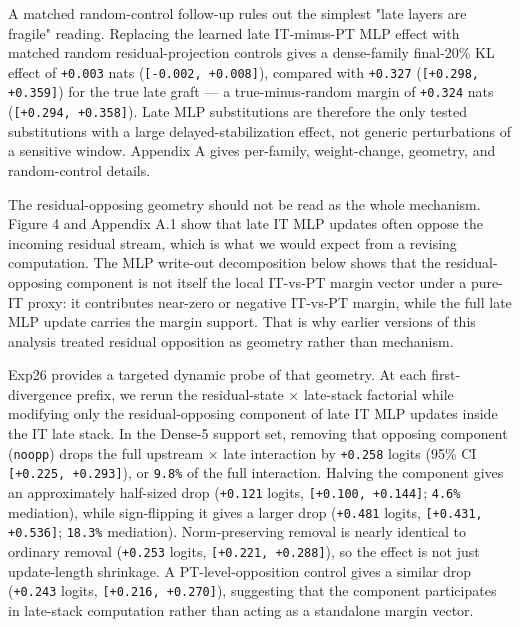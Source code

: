 \documentclass[11pt]{article}
\begin{document}
A matched random-control follow-up rules out the simplest "late layers are fragile" reading. Replacing the learned late IT-minus-PT MLP effect with matched random residual-projection controls gives a dense-family final-20\% KL effect of \texttt{+0.003} nats (\texttt{[-0.002, +0.008]}), compared with \texttt{+0.327} (\texttt{[+0.298, +0.359]}) for the true late graft --- a true-minus-random margin of \texttt{+0.324} nats (\texttt{[+0.294, +0.358]}). Late MLP substitutions are therefore the only tested substitutions with a large delayed-stabilization effect, not generic perturbations of a sensitive window. Appendix A gives per-family, weight-change, geometry, and random-control details.

The residual-opposing geometry should not be read as the whole mechanism. Figure 4 and Appendix A.1 show that late IT MLP updates often oppose the incoming residual stream, which is what we would expect from a revising computation. The MLP write-out decomposition below shows that the residual-opposing component is not itself the local IT-vs-PT margin vector under a pure-IT proxy: it contributes near-zero or negative IT-vs-PT margin, while the full late MLP update carries the margin support. That is why earlier versions of this analysis treated residual opposition as geometry rather than mechanism.

Exp26 provides a targeted dynamic probe of that geometry. At each first-divergence prefix, we rerun the residual-state \ensuremath{\times} late-stack factorial while modifying only the residual-opposing component of late IT MLP updates inside the IT late stack. In the Dense-5 support set, removing that opposing component (\texttt{noopp}) drops the full upstream \ensuremath{\times} late interaction by \texttt{+0.258} logits (95\% CI \texttt{[+0.225, +0.293]}), or \texttt{9.8\%} of the full interaction. Halving the component gives an approximately half-sized drop (\texttt{+0.121} logits, \texttt{[+0.100, +0.144]}; \texttt{4.6\%} mediation), while sign-flipping it gives a larger drop (\texttt{+0.481} logits, \texttt{[+0.431, +0.536]}; \texttt{18.3\%} mediation). Norm-preserving removal is nearly identical to ordinary removal (\texttt{+0.253} logits, \texttt{[+0.221, +0.288]}), so the effect is not just update-length shrinkage. A PT-level-opposition control gives a similar drop (\texttt{+0.243} logits, \texttt{[+0.216, +0.270]}), suggesting that the component participates in late-stack computation rather than acting as a standalone margin vector.
\end{document}
